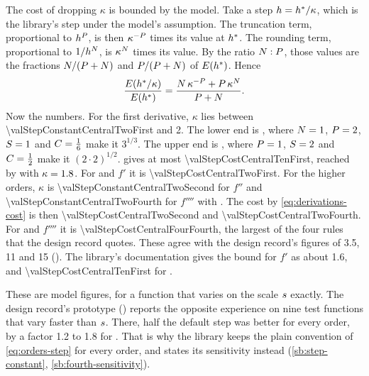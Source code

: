 The cost of dropping $\kappa$ is bounded by the model. Take a step $h = h^{\ast} / \kappa$, which is the library's step
under the model's assumption. The truncation term, proportional to $h^{P}$, is then $\kappa^{-P}$ times
its value at $h^{\ast}$. The rounding term, proportional to $1/h^{N}$, is $\kappa^{N}$ times its value. By
the ratio $N : P$, those values are the fractions $N / (P + N)$ and
$P / (P + N)$ of $E(h^{\ast})$. Hence
\begin{equation}
  \frac{E(h^{\ast} / \kappa)}{E(h^{\ast})} = \frac{N\, \kappa^{-P} + P\, \kappa^{N}}{P + N} .
  \label{eq:derivations-cost}
\end{equation}
Now the numbers. For the first derivative, $\kappa$ lies between \num{\valStepConstantCentralTwoFirst} and 2. The
lower end is , where $N = 1$, $P = 2$, $S = 1$ and $C = \tfrac16$ make it
$3^{1/3}$. The upper end is , where $P = 1$, $S = 2$ and $C = \tfrac12$ make it
$(2 \cdot 2)^{1/2}$.  gives at most \num{\valStepCostCentralTenFirst}, reached by
 with $\kappa = \num{1.8}$. For  and $f'$ it is
\num{\valStepCostCentralTwoFirst}. For the higher orders, $\kappa$ is \num{\valStepConstantCentralTwoSecond} for
$f''$ and \num{\valStepConstantCentralTwoFourth} for $f''''$ with . The cost by
\cref{eq:derivations-cost} is then \num{\valStepCostCentralTwoSecond} and \num{\valStepCostCentralTwoFourth}. For
 and $f''''$ it is \num{\valStepCostCentralFourFourth}, the largest of the four rules that the design
record quotes. These agree with the design record's figures of 3.5, 11 and 15 (). The
library's documentation gives the bound for $f'$ as about 1.6, and \num{\valStepCostCentralTenFirst} for
.

These are model figures, for a function that varies on the scale $s$ exactly. The design record's prototype
() reports the opposite experience on nine test functions that vary faster than
$s$. There, half the default step was better for every order, by a factor 1.2 to 1.8 for .
That is why the library keeps the plain convention of \cref{eq:orders-step} for every order, and states its
sensitivity instead (\cref{sb:step-constant}, \cref{sb:fourth-sensitivity}).
